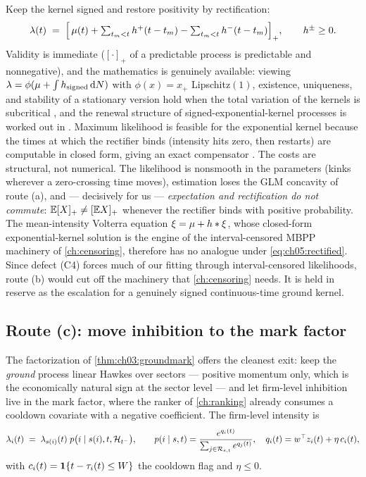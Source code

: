 Keep the kernel signed and restore positivity by rectification:
\begin{equation}\label{eq:ch05:rectified}
\lambda(t) \;=\; \Big[\, \mu(t)
+ \textstyle\sum_{t_m<t} h^{+}(t-t_m)
- \sum_{t_m<t} h^{-}(t-t_m) \Big]_{+},
\qquad h^{\pm} \ge 0 .
\end{equation}
Validity is immediate ($[\cdot]_+$ of a predictable process is
predictable and nonnegative), and the mathematics is genuinely available:
viewing $\lambda = \phi(\mu + \int h_{\mathrm{signed}} \,\mathrm{d} N)$ with
$\phi(x)=x_+$ Lipschitz$(1)$, existence, uniqueness, and stability of a
stationary version hold when the total variation of the kernels is
subcritical \citep{bremaud1996}, and the renewal structure of
signed-exponential-kernel processes is worked out in
\citet{costa2020}. Maximum likelihood is feasible for the exponential
kernel because the times at which the rectifier binds (intensity hits
zero, then restarts) are computable in closed form, giving an exact
compensator \citep{bonnet2021}. The costs are structural, not numerical.
The likelihood is nonsmooth in the parameters (kinks wherever a
zero-crossing time moves), estimation loses the GLM concavity of route
(a), and --- decisively for us --- \emph{expectation and rectification do
not commute}: $\mathbb{E}[X]_+ \ne [\mathbb{E} X]_+$ whenever the rectifier binds with
positive probability. The mean-intensity Volterra equation $\xi = \mu +
h * \xi$, whose closed-form exponential-kernel solution is the
engine of the interval-censored MBPP machinery of \cref{ch:censoring},
therefore has no analogue under \cref{eq:ch05:rectified}. Since defect
(C4) forces much of our fitting through interval-censored likelihoods,
route (b) would cut off the machinery that \cref{ch:censoring} needs.
It is held in reserve as the escalation for a genuinely signed
continuous-time ground kernel.

\subsection*{Route (c): move inhibition to the mark factor}

The factorization of \cref{thm:ch03:groundmark} offers the cleanest exit:
keep the \emph{ground} process linear Hawkes over sectors --- positive
momentum only, which is the economically natural sign at the sector level
--- and let firm-level inhibition live in the mark factor, where the
ranker of \cref{ch:ranking} already consumes a cooldown covariate with a
negative coefficient. The firm-level intensity is
\begin{equation}\label{eq:ch05:markfactor}
\lambda_i(t) \;=\; \lambda_{s(i)}(t)\; p\big(i \mid s(i), t, \mathcal{H}_{t^-}\big),
\qquad
p(i \mid s, t) = \frac{e^{q_i(t)}}{\sum_{j \in \mathcal{R}_{s,t}}
e^{q_j(t)}},
\quad
q_i(t) = w^\top z_i(t) + \eta\, c_i(t),
\end{equation}
with $c_i(t) = \mathbf{1}\{t - \tau_i(t) \le W\}$ the cooldown flag and $\eta \le
0$.

